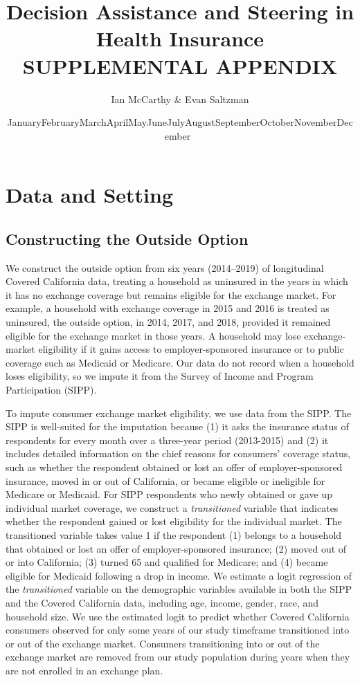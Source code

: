 \documentclass[12pt]{article}
\newcommand{\monthyear}{\ifcase\month\or January\or February\or March\or April\or May\or June\or July\or August\or September\or October\or November\or December\fi\ \the\year}
\begin{document}
\title{Decision Assistance and Steering in Health Insurance \\
        SUPPLEMENTAL APPENDIX}
\author{Ian McCarthy \& Evan Saltzman}
\date{\monthyear}
\maketitle


\section{Data and Setting}
\label{app:data}

\subsection{Constructing the Outside Option}
\label{app:outside_option}

We construct the outside option from six years (2014--2019) of longitudinal Covered California data, treating a household as uninsured in the years in which it has no exchange coverage but remains eligible for the exchange market. For example, a household with exchange coverage in 2015 and 2016 is treated as uninsured, the outside option, in 2014, 2017, and 2018, provided it remained eligible for the exchange market in those years. A household may lose exchange-market eligibility if it gains access to employer-sponsored insurance or to public coverage such as Medicaid or Medicare. Our data do not record when a household loses eligibility, so we impute it from the Survey of Income and Program Participation (SIPP).

To impute consumer exchange market eligibility, we use data from the SIPP. The SIPP is well-suited for the imputation because (1) it asks the insurance status of respondents for every month over a three-year period (2013-2015) and (2) it includes detailed information on the chief reasons for consumers' coverage status, such as whether the respondent obtained or lost an offer of employer-sponsored insurance, moved in or out of California, or became eligible or ineligible for Medicare or Medicaid. For SIPP respondents who newly obtained or gave up individual market coverage, we construct a \textit{transitioned} variable that indicates whether the respondent gained or lost eligibility for the individual market. The transitioned variable takes value 1 if the respondent (1) belongs to a household that obtained or lost an offer of employer-sponsored insurance; (2) moved out of or into California; (3) turned 65 and qualified for Medicare; and (4) became eligible for Medicaid following a drop in income. We estimate a logit regression of the \textit{transitioned} variable on the demographic variables available in both the SIPP and the Covered California data, including age, income, gender, race, and household size. We use the estimated logit to predict whether Covered California consumers observed for only some years of our study timeframe transitioned into or out of the exchange market. Consumers transitioning into or out of the exchange market are removed from our study population during years when they are not enrolled in an exchange plan.
\end{document}
